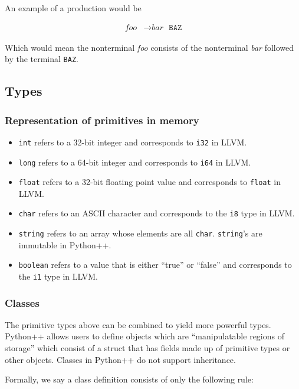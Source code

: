 \documentclass{article}
\begin{document}
An example of a production would be

\begin{align*}
    \textit{foo} &\to \hyperref[sec:bar]{\textit{bar}} \texttt{ } \texttt{BAZ}
\end{align*}

Which would mean the nonterminal \textit{foo} consists of the nonterminal \textit{bar} followed by the terminal \texttt{BAZ}.

\subsection{Types}
\subsubsection{Representation of primitives in memory}
\begin{itemize}
    \item \texttt{int} refers to a 32-bit integer and corresponds to \texttt{i32} in LLVM.
    \item \texttt{long} refers to a 64-bit integer and corresponds to \texttt{i64} in LLVM.
    \item \texttt{float} refers to a 32-bit floating point value and corresponds to \texttt{float} in LLVM.
    \item \texttt{char} refers to an ASCII character and corresponds to the \texttt{i8} type in LLVM.
    \item \texttt{string} refers to an array whose elements are all \texttt{char}. \texttt{string}'s are immutable in Python++.
    \item \texttt{boolean} refers to a value that is either ``true'' or ``false'' and corresponds to the \texttt{i1} type in LLVM.
\end{itemize}

\subsubsection{Classes}
The primitive types above can be combined to yield more powerful types. Python++ allows users to define objects which are ``manipulatable regions of storage'' which consist of a struct that has fields made up of primitive types or other objects. Classes in Python++ do not support inheritance.

Formally, we say a class definition consists of only the following rule:
\end{document}
